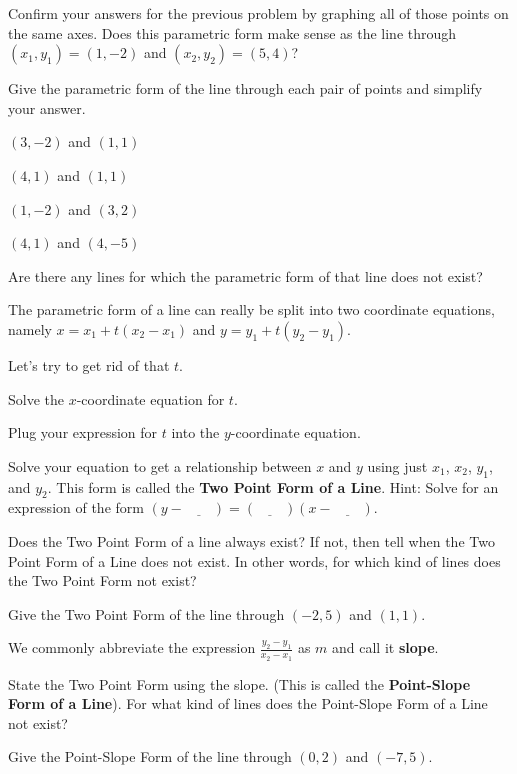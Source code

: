 \bq Confirm your answers for the previous problem by graphing all of those points on the same axes. Does this parametric form make sense as the line through $(x_1,y_1)=(1,-2)$ and $(x_2,y_2) = (5,4)$?
\eq

\bq Give the parametric form of the line through each pair of points and simplify your answer.
\be
\item $(3,-2)$ and $(1,1)$
\item $(4,1)$ and $(1,1)$
\item $(1,-2)$ and $(3,2)$
\item $(4,1)$ and $(4,-5)$
\ee
\eq

\bq Are there any lines for which the parametric form of that line does not exist?
\eq



\begin{info} The parametric form of a line can really be split into two coordinate equations, namely $x = x_1+t(x_2-x_1)$ and $y=y_1+t(y_2-y_1)$. \end{info}

\bq\label{q16} Let's try to get rid of that $t$.
\be
\item Solve the $x$-coordinate equation for $t$.
\item Plug your expression for $t$ into the $y$-coordinate equation.
\item Solve your equation to get a relationship between $x$ and $y$ using just $x_1$, $x_2$, $y_1$, and $y_2$. This form is called the \textbf{Two Point Form of a Line}. Hint: Solve for an expression of the form $(y- \underline{\quad \quad} )= (\underline{\quad \quad} )(x- \underline{\quad \quad} )$.
\ee \eq

\bq Does the Two Point Form of a line always exist? If not, then tell when the Two Point Form of a Line does not exist. In other words, for which kind of lines does the Two Point Form not exist?
\eq

\bq Give the Two Point Form of the line through $(-2,5)$ and $(1,1)$.
\eq

\begin{info} We commonly abbreviate the expression $\frac{y_2-y_1}{x_2-x_1}$ as $m$ and call it \textbf{slope}. \end{info}

\bq State the Two Point Form using the slope. (This is called the \textbf{Point-Slope Form of a Line}). For what kind of lines does the Point-Slope Form of a Line not exist?
\eq

\bq Give the Point-Slope Form of the line through $(0,2)$ and $(-7,5)$.
\eq

